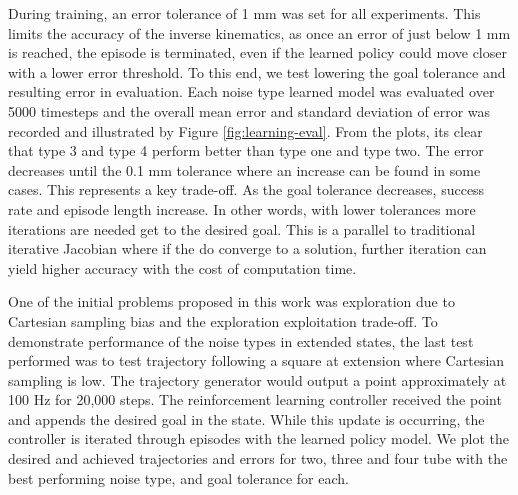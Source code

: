 During training, an error tolerance of 1 mm was set for all experiments. This limits the accuracy of the inverse kinematics, as once an error of just below 1 mm is reached, the episode is terminated, even if the learned policy could move closer with a lower error threshold. To this end, we test lowering the goal tolerance and resulting error in evaluation. Each noise type learned model was evaluated over 5000 timesteps and the overall mean error and standard deviation of error was recorded and illustrated by Figure \ref{fig:learning-eval}. From the plots, its clear that type 3 and type 4 perform better than type one and type two. The error decreases until the 0.1 mm tolerance where an increase can be found in some cases. This represents a key trade-off. As the goal tolerance decreases, success rate and episode length increase. In other words, with lower tolerances more iterations are needed get to the desired goal. This is a parallel to traditional iterative Jacobian where if the do converge to a solution, further iteration can yield higher accuracy with the cost of computation time.

One of the initial problems proposed in this work was exploration due to Cartesian sampling bias and the exploration exploitation trade-off. To demonstrate performance of the noise types in extended states, the last test performed was to test trajectory following a square at extension where Cartesian sampling is low. The trajectory generator would output a point approximately at 100 Hz for 20,000 steps. The reinforcement learning controller received the point and appends the desired goal in the state. While this update is occurring, the controller is iterated through episodes with the learned policy model. We plot the desired and achieved trajectories and errors for two, three and four tube with the best performing noise type, and goal tolerance for each.


